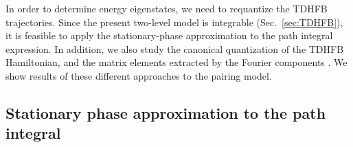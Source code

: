 \documentclass[%
superscriptaddress,
preprint,
showpacs,
nofootinbib,
amsmath,amssymb,
aps,
prc,
floatfix ]%
{revtex4-1}
\begin{document}
In order to determine energy eigenstates,
we need to requantize the TDHFB trajectories.
Since the present two-level model is integrable (Sec.~\ref{sec:TDHFB}),
it is feasible to apply the stationary-phase approximation to
the path integral expression.
In addition, we also study the canonical quantization of the TDHFB
Hamiltonian, and the matrix elements extracted by the Fourier components
\cite{CDS84}.
We show results of these different approaches to the pairing model.


\subsection{Stationary phase approximation to the path integral}
\label{sec:SPA}
\end{document}
